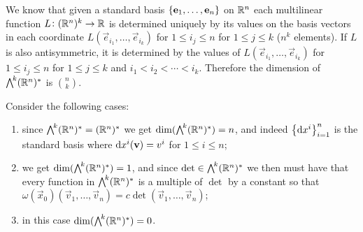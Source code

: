 \documentclass[11pt,a4paper]{article}
\begin{document}
\begin{remark}
  \label{rmk:dimension-of-lambda}
  We know that given a standard basis $\left\{\boldsymbol{\mathbf{e}}_1,\dots,\boldsymbol{\mathbf{e}}_n\right\}$ on $\mathbb{R}^n$
  each multilinear function $L \colon (\mathbb{R}^n)^k \to \mathbb{R}$
  is determined uniquely by its values on the basis vectors
  in each coordinate $L(\vec e_{i_1},\dots,\vec e_{i_k})$
  for $1 \le i_j \le n$ for $1 \le j \le k$ ($n^k$ elements).
  If $L$ is also antisymmetric,
  it is determined by the values of
  $L(\vec e_{i_1},\dots,\vec e_{i_k})$
  for $1 \le i_j \le n$ for $1 \le j \le k$ and
  $i_1 < i_2 < \cdots < i_k$.
  Therefore the dimension of $\bigwedge^{\!k}(\mathbb{R}^n)^*$ is $\binom{n}{k}$.
\end{remark}

\begin{example}
  Consider the following cases:
  \begin{enumerate}
    \item[$(k=1)$] since $\bigwedge^{\!k}(\mathbb{R}^n)^* = (\mathbb{R}^n)^*$
      we get $\dim(\bigwedge^{\!k}(\mathbb{R}^n)^*) = n$,
      and indeed $\set{\dx^i}_{i=1}^{n}$ is the standard basis
      where $\dx^i(\vec v) = v^i$ for $1 \le i \le n$;
    \item[$(k=n)$] we get $\dim(\bigwedge^{\!k}(\mathbb{R}^n)^*) = 1$,
      and since $\det \in \bigwedge^{\!k}(\mathbb{R}^n)^*$
      we then must have that every function in $\bigwedge^{\!k}(\mathbb{R}^n)^*$
      is a multiple of $\det$ by a constant
      so that $\omega(\vec x_0)(\vec v_1,\dots,\vec v_n) = c \det(\vec v_1,\dots,\vec v_n)$;
    \item[$(k > n)$] in this case $\dim(\bigwedge^{\!k}(\mathbb{R}^n)^*) = 0$.
  \end{enumerate}
\end{example}
\end{document}

